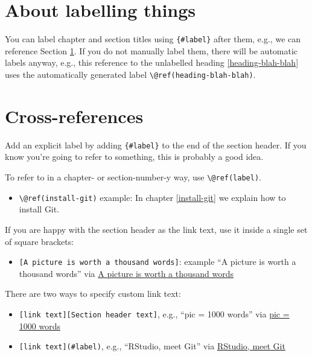 \documentclass[
]{book}
\providecommand{\tightlist}{%
  \setlength{\itemsep}{0pt}\setlength{\parskip}{0pt}}
\begin{document}
\section{About labelling things}\label{id-example}

You can label chapter and section titles using \texttt{\{\#label\}} after them, e.g., we can reference Section \ref{id-example}. If you do not manually label them, there will be automatic labels anyway, e.g., this reference to the unlabelled heading \ref{heading-blah-blah} uses the automatically generated label \texttt{\textbackslash{}@ref(heading-blah-blah)}.

\section{Cross-references}\label{cross-references}

Add an explicit label by adding \texttt{\{\#label\}} to the end of the section header. If you know you're going to refer to something, this is probably a good idea.

To refer to in a chapter- or section-number-y way, use \texttt{\textbackslash{}@ref(label)}.

\begin{itemize}
\tightlist
\item
  \texttt{\textbackslash{}@ref(install-git)} example: In chapter \ref{install-git} we explain how to install Git.
\end{itemize}

If you are happy with the section header as the link text, use it inside a single set of square brackets:

\begin{itemize}
\tightlist
\item
  \texttt{{[}A\ picture\ is\ worth\ a\ thousand\ words{]}}: example ``A picture is worth a thousand words'' via \hyperref[a-picture-is-worth-a-thousand-words]{A picture is worth a thousand words}
\end{itemize}

There are two ways to specify custom link text:

\begin{itemize}
\tightlist
\item
  \texttt{{[}link\ text{]}{[}Section\ header\ text{]}}, e.g., ``pic = 1000 words'' via \hyperref[a-picture-is-worth-a-thousand-words]{pic = 1000 words}
\item
  \texttt{{[}link\ text{]}(\#label)}, e.g., ``RStudio, meet Git'' via \hyperref[rstudio-see-git]{RStudio, meet Git}
\end{itemize}
\end{document}
